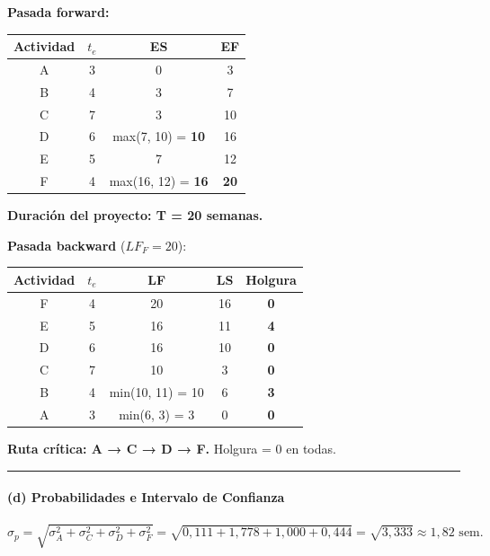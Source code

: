 \documentclass[
]{article}
\begin{document}
\textbf{Pasada forward:}

\begin{longtable}[]{@{}cccc@{}}
\toprule\noalign{}
Actividad & \(t_e\) & ES & EF \\
\midrule\noalign{}
\endhead
\bottomrule\noalign{}
\endlastfoot
A & 3 & 0 & 3 \\
B & 4 & 3 & 7 \\
C & 7 & 3 & 10 \\
D & 6 & max(7, 10) = \textbf{10} & 16 \\
E & 5 & 7 & 12 \\
F & 4 & max(16, 12) = \textbf{16} & \textbf{20} \\
\end{longtable}

\textbf{Duración del proyecto: T = 20 semanas.}

\textbf{Pasada backward} (\(LF_F = 20\)):

\begin{longtable}[]{@{}ccccc@{}}
\toprule\noalign{}
Actividad & \(t_e\) & LF & LS & \textbf{Holgura} \\
\midrule\noalign{}
\endhead
\bottomrule\noalign{}
\endlastfoot
F & 4 & 20 & 16 & \textbf{0} \\
E & 5 & 16 & 11 & \textbf{4} \\
D & 6 & 16 & 10 & \textbf{0} \\
C & 7 & 10 & 3 & \textbf{0} \\
B & 4 & min(10, 11) = 10 & 6 & \textbf{3} \\
A & 3 & min(6, 3) = 3 & 0 & \textbf{0} \\
\end{longtable}

\textbf{Ruta crítica: A → C → D → F.} Holgura = 0 en todas.

\begin{center}\rule{0.5\linewidth}{0.5pt}\end{center}

\hypertarget{d-probabilidades-e-intervalo-de-confianza}{%
\paragraph{(d) Probabilidades e Intervalo de
Confianza}\label{d-probabilidades-e-intervalo-de-confianza}}

\[\sigma_p = \sqrt{\sigma_A^2 + \sigma_C^2 + \sigma_D^2 + \sigma_F^2} = \sqrt{0{,}111 + 1{,}778 + 1{,}000 + 0{,}444} = \sqrt{3{,}333} \approx 1{,}82 \text{ sem.}\]
\end{document}
